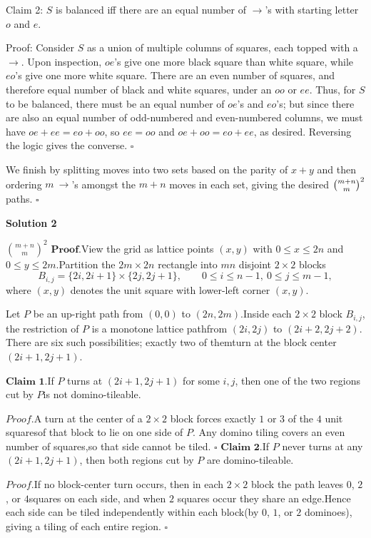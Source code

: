 \begin{enumerate}
 Claim 2: $S$ is balanced iff there are an equal number of $\rightarrow$'s with starting letter $o$ and $e$.

 Proof: Consider $S$ as a union of multiple columns of squares, each topped with a $\rightarrow$. Upon inspection, $oe$'s give one more black square than white square, while $eo$'s give one more white square. There are an even number of squares, and therefore equal number of black and white squares, under an $oo$ or $ee$. Thus, for $S$ to be balanced, there must be an equal number of $oe$'s and $eo$'s; but since there are also an equal number of odd-numbered and even-numbered columns, we must have $oe+ee=eo+oo$, so $ee=oo$ and $oe+oo=eo+ee$, as desired. Reversing the logic gives the converse. $\square$

 We finish by splitting moves into two sets based on the parity of $x+y$ and then ordering $m~\rightarrow$'s amongst the $m+n$ moves in each set, giving the desired $\tbinom{m+n}{m}^2$ paths. $\square$




\textbf{Solution 2}

$\boxed{\binom{m+n}{m}^2}$
$\textbf{Proof.}$View the grid as lattice points $(x,y)$ with $0\le x\le 2n$ and $0\le y\le 2m$.Partition the $2m\times 2n$ rectangle into $mn$ disjoint $2\times 2$ blocks
 \[B_{i,j}=\{2i,2i+1\}\times\{2j,2j+1\}, \qquad 0\le i\le n-1,\ 0\le j\le m-1,\]where $(x,y)$ denotes the unit square with lower-left corner $(x,y)$.

 Let $P$ be an up-right path from $(0,0)$ to $(2n,2m)$.Inside each $2\times 2$ block $B_{i,j}$, the restriction of $P$ is a monotone lattice pathfrom $(2i,2j)$ to $(2i+2,2j+2)$. There are six such possibilities; exactly two of themturn at the block center $(2i+1,2j+1)$.

 $\textbf{Claim 1.}$If $P$ turns at $(2i+1,2j+1)$ for some $i,j$, then one of the two regions cut by $P$is not domino-tileable.

 $\textit{Proof.}$A turn at the center of a $2\times 2$ block forces exactly $1$ or $3$ of the $4$ unit squaresof that block to lie on one side of $P$. Any domino tiling covers an even number of squares,so that side cannot be tiled. $\square$
$\textbf{Claim 2.}$If $P$ never turns at any $(2i+1,2j+1)$, then both regions cut by $P$ are domino-tileable.

 $\textit{Proof.}$If no block-center turn occurs, then in each $2\times 2$ block the path leaves $0$, $2$, or $4$squares on each side, and when $2$ squares occur they share an edge.Hence each side can be tiled independently within each block(by $0$, $1$, or $2$ dominoes), giving a tiling of each entire region. $\square$


\end{enumerate}
